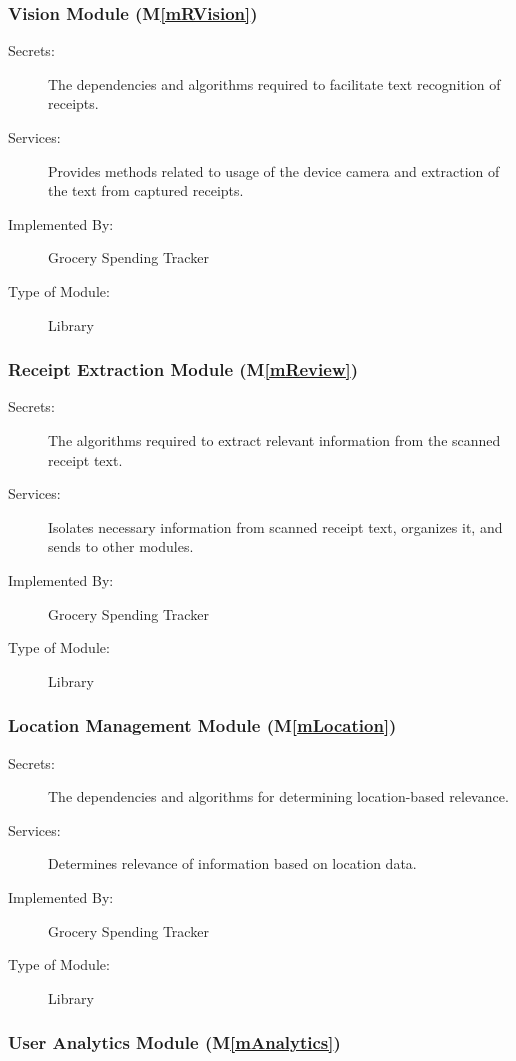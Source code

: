 \documentclass[12pt, titlepage]{article}
\newcommand{\mref}[1]{M\ref{#1}}
\begin{document}
\subsubsection{Vision Module (\mref{mRVision})}

\begin{description}
\item[Secrets:] The dependencies and algorithms required to facilitate text recognition of receipts.
\item[Services:] Provides methods related to usage of the device camera and extraction of the text from captured
receipts.
\item[Implemented By:] Grocery Spending Tracker
\item[Type of Module:] Library
\end{description}

\subsubsection{Receipt Extraction Module (\mref{mReview})}

\begin{description}
\item[Secrets:] The algorithms required to extract relevant information from the scanned receipt text.
\item[Services:] Isolates necessary information from scanned receipt text, organizes it, and sends to other
modules.
\item[Implemented By:] Grocery Spending Tracker
\item[Type of Module:] Library
\end{description}

\subsubsection{Location Management Module (\mref{mLocation})}

\begin{description}
\item[Secrets:] The dependencies and algorithms for determining location-based relevance. 
\item[Services:] Determines relevance of information based on location data.
\item[Implemented By:] Grocery Spending Tracker
\item[Type of Module:] Library
\end{description}

\subsubsection{User Analytics Module (\mref{mAnalytics})}
\end{document}
